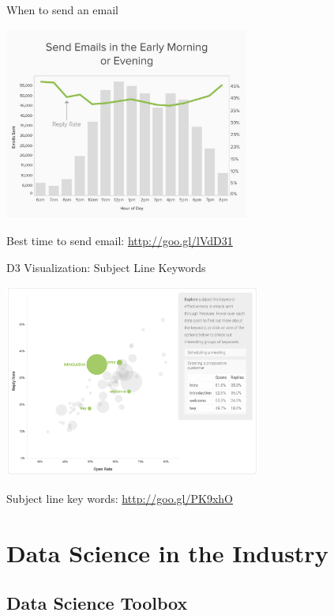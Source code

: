 \documentclass[10pt]{beamer}
\begin{document}
    \begin{frame}{When to send an email}
      \begin{center}
        \includegraphics[height=180pt]{../graphs/email_analysis_sent_hour}
      \end{center}    
      {\footnotesize Best time to send email: \url{http://goo.gl/lVdD31}}
    \end{frame}

    \begin{frame}{D3 Visualization: Subject Line Keywords}
      \begin{center}
        \includegraphics[height=180pt]{../graphs/email_analysis_subject_line}
      \end{center}    
      {\footnotesize Subject line key words: \url{http://goo.gl/PK9xhO}}
    \end{frame}

\section{Data Science in the Industry}

  \subsection{Data Science Toolbox}
  
\end{document}
